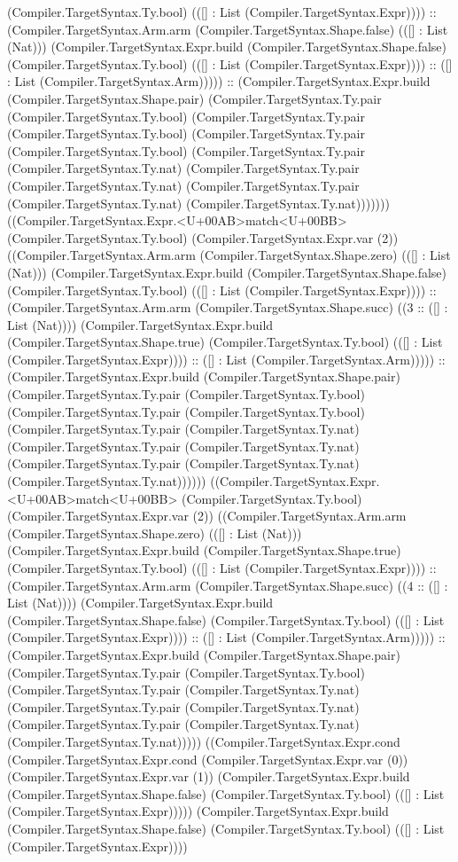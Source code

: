 \documentclass[11pt]{article}
\begin{document}
(Compiler.TargetSyntax.Ty.bool) (([] : List (Compiler.TargetSyntax.Expr)))) :: (Compiler.TargetSyntax.Arm.arm (Compiler.TargetSyntax.Shape.false) (([] : List (Nat))) (Compiler.TargetSyntax.Expr.build (Compiler.TargetSyntax.Shape.false) (Compiler.TargetSyntax.Ty.bool) (([] : List (Compiler.TargetSyntax.Expr)))) :: ([] : List (Compiler.TargetSyntax.Arm))))) :: (Compiler.TargetSyntax.Expr.build (Compiler.TargetSyntax.Shape.pair) (Compiler.TargetSyntax.Ty.pair (Compiler.TargetSyntax.Ty.bool) (Compiler.TargetSyntax.Ty.pair (Compiler.TargetSyntax.Ty.bool) (Compiler.TargetSyntax.Ty.pair (Compiler.TargetSyntax.Ty.bool) (Compiler.TargetSyntax.Ty.pair (Compiler.TargetSyntax.Ty.nat) (Compiler.TargetSyntax.Ty.pair (Compiler.TargetSyntax.Ty.nat) (Compiler.TargetSyntax.Ty.pair (Compiler.TargetSyntax.Ty.nat) (Compiler.TargetSyntax.Ty.nat))))))) ((Compiler.TargetSyntax.Expr.<U+00AB>match<U+00BB> (Compiler.TargetSyntax.Ty.bool) (Compiler.TargetSyntax.Expr.var (2)) ((Compiler.TargetSyntax.Arm.arm (Compiler.TargetSyntax.Shape.zero) (([] : List (Nat))) (Compiler.TargetSyntax.Expr.build (Compiler.TargetSyntax.Shape.false) (Compiler.TargetSyntax.Ty.bool) (([] : List (Compiler.TargetSyntax.Expr)))) :: (Compiler.TargetSyntax.Arm.arm (Compiler.TargetSyntax.Shape.succ) ((3 :: ([] : List (Nat)))) (Compiler.TargetSyntax.Expr.build (Compiler.TargetSyntax.Shape.true) (Compiler.TargetSyntax.Ty.bool) (([] : List (Compiler.TargetSyntax.Expr)))) :: ([] : List (Compiler.TargetSyntax.Arm))))) :: (Compiler.TargetSyntax.Expr.build (Compiler.TargetSyntax.Shape.pair) (Compiler.TargetSyntax.Ty.pair (Compiler.TargetSyntax.Ty.bool) (Compiler.TargetSyntax.Ty.pair (Compiler.TargetSyntax.Ty.bool) (Compiler.TargetSyntax.Ty.pair (Compiler.TargetSyntax.Ty.nat) (Compiler.TargetSyntax.Ty.pair (Compiler.TargetSyntax.Ty.nat) (Compiler.TargetSyntax.Ty.pair (Compiler.TargetSyntax.Ty.nat) (Compiler.TargetSyntax.Ty.nat)))))) ((Compiler.TargetSyntax.Expr.<U+00AB>match<U+00BB> (Compiler.TargetSyntax.Ty.bool) (Compiler.TargetSyntax.Expr.var (2)) ((Compiler.TargetSyntax.Arm.arm (Compiler.TargetSyntax.Shape.zero) (([] : List (Nat))) (Compiler.TargetSyntax.Expr.build (Compiler.TargetSyntax.Shape.true) (Compiler.TargetSyntax.Ty.bool) (([] : List (Compiler.TargetSyntax.Expr)))) :: (Compiler.TargetSyntax.Arm.arm (Compiler.TargetSyntax.Shape.succ) ((4 :: ([] : List (Nat)))) (Compiler.TargetSyntax.Expr.build (Compiler.TargetSyntax.Shape.false) (Compiler.TargetSyntax.Ty.bool) (([] : List (Compiler.TargetSyntax.Expr)))) :: ([] : List (Compiler.TargetSyntax.Arm))))) :: (Compiler.TargetSyntax.Expr.build (Compiler.TargetSyntax.Shape.pair) (Compiler.TargetSyntax.Ty.pair (Compiler.TargetSyntax.Ty.bool) (Compiler.TargetSyntax.Ty.pair (Compiler.TargetSyntax.Ty.nat) (Compiler.TargetSyntax.Ty.pair (Compiler.TargetSyntax.Ty.nat) (Compiler.TargetSyntax.Ty.pair (Compiler.TargetSyntax.Ty.nat) (Compiler.TargetSyntax.Ty.nat))))) ((Compiler.TargetSyntax.Expr.cond (Compiler.TargetSyntax.Expr.cond (Compiler.TargetSyntax.Expr.var (0)) (Compiler.TargetSyntax.Expr.var (1)) (Compiler.TargetSyntax.Expr.build (Compiler.TargetSyntax.Shape.false) (Compiler.TargetSyntax.Ty.bool) (([] : List (Compiler.TargetSyntax.Expr))))) (Compiler.TargetSyntax.Expr.build (Compiler.TargetSyntax.Shape.false) (Compiler.TargetSyntax.Ty.bool) (([] : List (Compiler.TargetSyntax.Expr)))) 
\end{document}
